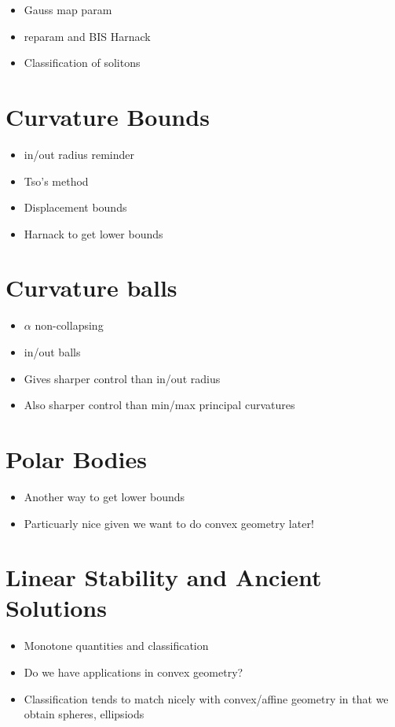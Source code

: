\begin{itemize}
\item Gauss map param
\item reparam and BIS Harnack
\item Classification of solitons
\end{itemize}

\section{Curvature Bounds}

\begin{itemize}
\item in/out radius reminder
\item Tso's method
\item Displacement bounds
\item Harnack to get lower bounds
\end{itemize}

\section{Curvature balls}

\begin{itemize}
\item \(\alpha\) non-collapsing
\item in/out balls
\item Gives sharper control than in/out radius
\item Also sharper control than min/max principal curvatures
\end{itemize}

\section{Polar Bodies}

\begin{itemize}
\item Another way to get lower bounds
\item Particuarly nice given we want to do convex geometry later!
\end{itemize}

\section{Linear Stability and Ancient Solutions}

\begin{itemize}
\item Monotone quantities and classification
\item Do we have applications in convex geometry?
\item Classification tends to match nicely with convex/affine geometry in that we obtain spheres, ellipsiods
\end{itemize}

